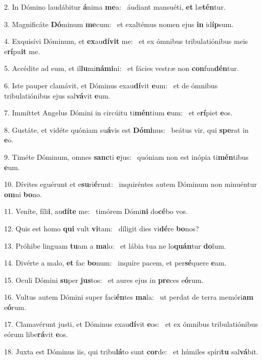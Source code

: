 2. In Dómino laudábitur \textbf{á}nima \textbf{me}a: \ast\  áudiant mansuéti, \textbf{et} læ\textbf{tén}tur.\

3. Magnificáte \textbf{Dó}minum \textbf{me}cum: \ast\  et exaltémus nomen ejus \textbf{in} id\textbf{íp}sum.\

4. Exquisívi Dóminum, et \textbf{ex}au\textbf{dí}\textbf{vit} me: \ast\  et ex ómnibus tribulatiónibus meis e\textbf{rí}pu\textbf{it} me.\

5. Accédite ad eum, et il\textbf{lu}mi\textbf{ná}\textbf{mi}ni: \ast\  et fácies vestræ non \textbf{con}fun\textbf{dén}tur.\

6. Iste pauper clamávit, et Dóminus exau\textbf{dí}vit \textbf{e}um: \ast\  et de ómnibus tribulatiónibus ejus sal\textbf{vá}vit \textbf{e}um.\

7. Immíttet Angelus Dómini in circúitu ti\textbf{mén}tium \textbf{e}um: \ast\  et e\textbf{rí}piet \textbf{e}os.\

8. Gustáte, et vidéte quóniam su\textbf{á}vis est \textbf{Dó}\textbf{mi}nus: \ast\  beátus vir, qui \textbf{spe}rat in \textbf{e}o.\

9. Timéte Dóminum, omnes \textbf{sanc}ti \textbf{e}jus: \ast\  quóniam non est inópia ti\textbf{mén}tibus \textbf{e}um.\

10. Dívites eguérunt et e\textbf{su}ri\textbf{é}runt: \ast\  inquiréntes autem Dóminum non minuéntur \textbf{om}ni \textbf{bo}no.\

11. Veníte, fíli\textbf{i}, au\textbf{dí}\textbf{te} me: \ast\  timórem Dómi\textbf{ni} do\textbf{cé}bo vos.\

12. Quis est homo \textbf{qui} vult \textbf{vi}tam: \ast\  díligit dies vi\textbf{dé}re \textbf{bo}nos?\

13. Próhibe linguam \textbf{tu}am a \textbf{ma}lo: \ast\  et lábia tua ne lo\textbf{quán}tur \textbf{do}lum.\

14. Divérte a malo, \textbf{et} fac \textbf{bo}num: \ast\  inquíre pacem, et per\textbf{sé}quere \textbf{e}am.\

15. Oculi Dómini \textbf{su}per \textbf{jus}tos: \ast\  et aures ejus in \textbf{pre}ces e\textbf{ó}rum.\

16. Vultus autem Dómini super faci\textbf{én}tes \textbf{ma}la: \ast\  ut perdat de terra memóri\textbf{am} e\textbf{ó}rum.\

17. Clamavérunt justi, et Dóminus exau\textbf{dí}vit \textbf{e}os: \ast\  et ex ómnibus tribulatiónibus eórum libe\textbf{rá}vit \textbf{e}os.\

18. Juxta est Dóminus iis, qui tribu\textbf{lá}to sunt \textbf{cor}de: \ast\  et húmiles spíri\textbf{tu} sal\textbf{vá}bit.\


